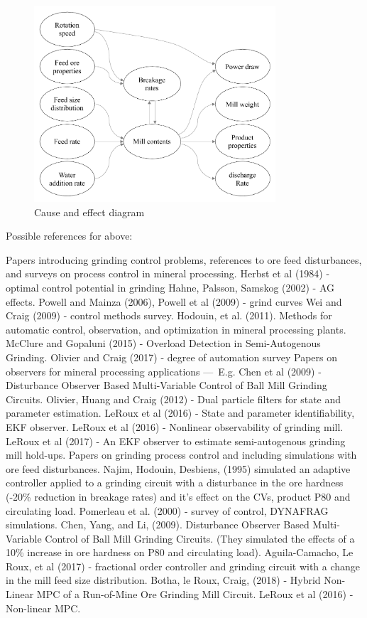 \begin{figure}[htp]
	\centering
	\includegraphics[width=9cm]{images/cause-effect.pdf}
	\caption{Cause and effect diagram} \label{fig:cause-effect}
\end{figure}

Possible references for above:
\begin{outline}
	\1 Papers introducing grinding control problems, references to ore feed disturbances, and surveys on process control in mineral processing.
	\2 Herbst et al (1984) - optimal control potential in grinding
	    \2 Hahne, Palsson, Samskog (2002) - AG effects.
	\2 Powell and Mainza (2006), Powell et al (2009) - grind curves
	\2 Wei and Craig (2009) - control methods survey.
	\2 Hodouin, et al. (2011). Methods for automatic control, observation, and optimization in mineral processing plants.
	\2 McClure and Gopaluni (2015) - Overload Detection in Semi-Autogenous Grinding.
	\2 Olivier and Craig (2017) - degree of automation survey
	\1 Papers on observers for mineral processing applications — E.g. 
	\2 Chen et al (2009) - Disturbance Observer Based Multi-Variable Control of Ball Mill Grinding Circuits. %
	\2 Olivier, Huang and Craig (2012) - Dual particle filters for state and parameter estimation.
	\2 LeRoux et al (2016) - State and parameter identifiability, EKF observer.
	\2 LeRoux et al (2016) - Nonlinear observability of grinding mill.
	\2 LeRoux et al (2017) - An EKF observer to estimate semi-autogenous grinding mill hold-ups.
	\1 Papers on grinding process control and including simulations with ore feed disturbances.
	\2 Najim, Hodouin, Desbiens, (1995) simulated an adaptive controller applied to a grinding circuit with a disturbance in the ore hardness (-20\% reduction in breakage rates) and it's effect on the CVs, product P80 and circulating load.
	\2 Pomerleau et al. (2000) - survey of control, DYNAFRAG simulations.
	\2 Chen, Yang, and Li, (2009). Disturbance Observer Based Multi-Variable Control of Ball Mill Grinding Circuits. (They simulated the effects of a 10\% increase in ore hardness on P80 and circulating load).
	\2 Aguila-Camacho, Le Roux, et al (2017) - fractional order controller and grinding circuit with a change in the mill feed size distribution.
	\2 Botha, le Roux, Craig, (2018) - Hybrid Non-Linear MPC of a Run-of-Mine Ore Grinding Mill Circuit.
	\2 LeRoux et al (2016) - Non-linear MPC.
\end{outline}


